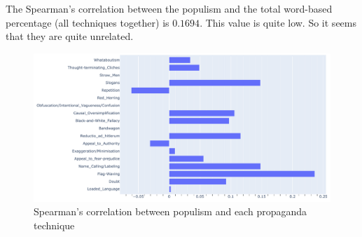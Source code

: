 






The Spearman's correlation between the populism and the total word-based percentage (all techniques together) is $0.1694$. This value is quite low. So it seems that they are quite unrelated. %

\begin{figure}[!htbp]
    \centering
    \includegraphics[width=\linewidth]{figures/populism_propaganda_correlation.pdf}
    \caption{Spearman's correlation between populism and each propaganda technique}
    \label{fig:populism_propaganda_correlation}
\end{figure}

